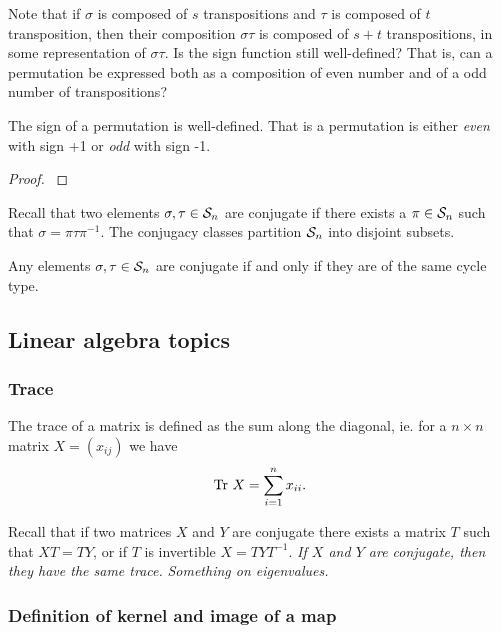 Note that if $\sigma$ is composed of $s$ transpositions and $\tau$ is composed of $t$ transposition, then their composition $\sigma\tau$ is composed of $s+t$ transpositions, in some representation of $\sigma\tau$. Is the sign function still well-defined? That is, can a permutation be expressed both as a composition of even number and of a odd number of transpositions?

\begin{proposition}\label{prop:signwelldefined}
	The sign of a permutation is well-defined. That is a permutation is either \textit{even} with sign +1 or \textit{odd} with sign -1.
\end{proposition}
\begin{proof}
	\cite[Thm.12.6.1.]{Biggs}
\end{proof}

Recall that two elements $\sigma, \tau \in \mathcal{S}_n$ are conjugate if there exists a $\pi \in \mathcal{S}_n$ such that $\sigma = \pi \tau \pi^{-1}$. The conjugacy classes partition $\mathcal{S}_n$ into disjoint subsets. 

\begin{proposition}
	Any elements $\sigma, \tau \in \mathcal{S}_n$ are conjugate if and only if they are of the same cycle type.
\end{proposition}





\subsection{Linear algebra topics}

	\subsubsection{Trace}
		
		The trace of a matrix is defined as the sum along the diagonal, ie. for a $n \times n$ matrix $X = (x_{ij})$ we have
		\begin{align*}
			\text{Tr } X = \sum_{i=1}^{n} x_{ii}.
		\end{align*}
		
		Recall that if two matrices $X$ and $Y$ are conjugate there exists a matrix $T$ such that $XT = TY$, or if $T$ is invertible $X = TYT^{-1}$. \textit{If $X$ and $Y$ are conjugate, then they have the same trace.} \textit{Something on eigenvalues.}

	\subsubsection{Definition of kernel and image of a map}
	
